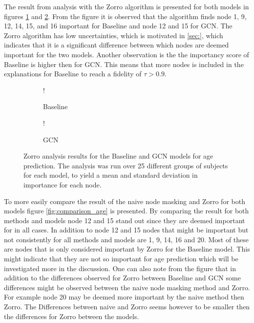 The result from analysis with the Zorro algorithm is presented for both models in figures \ref{fig:zorro_age_baseline} and \ref{fig:zorro_age_gcn}. From the figure it is observed that the algorithm finds node 1, 9, 12, 14, 15, and 16 important for Baseline and node 12 and 15 for GCN. The Zorro algorithm has low uncertainties, which is motivated in \ref{sec:}, which indicates that it is a significant difference between which nodes are deemed important for the two models. Another observation is the the importancy score of Baseline is higher then for GCN. This means that more nodes is included in the explanations for Baseline to reach a fidelity of $\tau>0.9$.

\begin{figure}[H]
    \centering
        \begin{subfigure}{.5\textwidth}
            \centering
            \begin{center}
                \resizebox {1.0\linewidth} {!} {
                    
                }
            \end{center}
            \caption{Baseline}
            \label{fig:zorro_age_baseline}
        \end{subfigure}%
        \begin{subfigure}{.5\textwidth}
            \centering
            \begin{center}
                \resizebox {1.0\linewidth} {!} {
                    
                }
            \end{center}
            \caption{GCN}
            \label{fig:zorro_age_gcn}
        \end{subfigure}
    \caption{Zorro analysis results for the Baseline and GCN models for age prediction. The analysis was run over 25 different groups of subjects for each model, to yield a mean and standard deviation in importance for each node.}
    \label{fig:zorro_age}
\end{figure}


To more easily compare the result of the naive node masking and Zorro for both models figure \ref{fig:comparison_age} is presented. By comparing the result for both methods and models node 12 and 15 stand out since they are deemed important for in all cases. In addition to node 12 and 15 nodes that might be important but not consistently for all methods and models are 1, 9, 14, 16 and 20. Most of these are nodes that is only considered important by Zorro for the Baseline model. This might indicate that they are not so important for age prediction which will be investigated more in the discussion. One can also note from the figure that in addition to the differences observed for Zorro between Baseline and GCN some differences might be observed between the naive node masking method and Zorro. For example node 20 may be deemed more important by the naive method then Zorro. The Differences between naive and Zorro seems however to be smaller then the differences for Zorro between the models. 


